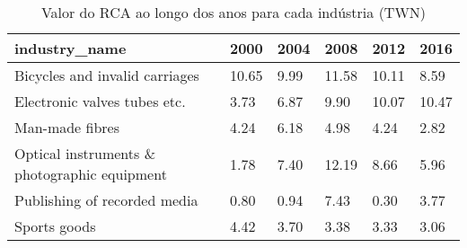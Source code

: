 \begin{table}
\centering
\caption{Valor do RCA ao longo dos anos para cada indústria (TWN)}
\begin{tabular}{p{6cm}p{1.5cm}p{1.5cm}p{1.5cm}p{1.5cm}p{1.5cm}}
\toprule
                               industry\_name &  2000 & 2004 &  2008 &  2012 &  2016 \\
\midrule
              Bicycles and invalid carriages & 10.65 & 9.99 & 11.58 & 10.11 &  8.59 \\
                Electronic valves tubes etc. &  3.73 & 6.87 &  9.90 & 10.07 & 10.47 \\
                             Man-made fibres &  4.24 & 6.18 &  4.98 &  4.24 &  2.82 \\
Optical instruments \& photographic equipment &  1.78 & 7.40 & 12.19 &  8.66 &  5.96 \\
                Publishing of recorded media &  0.80 & 0.94 &  7.43 &  0.30 &  3.77 \\
                                Sports goods &  4.42 & 3.70 &  3.38 &  3.33 &  3.06 \\
\bottomrule
\end{tabular}
\end{table}
